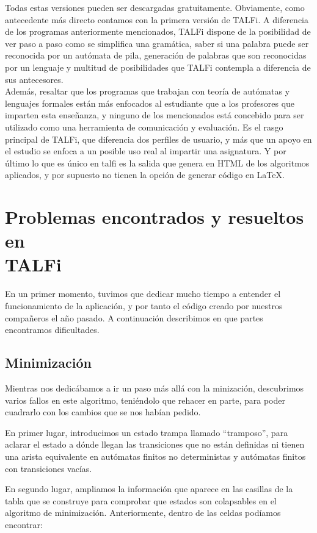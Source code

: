 \documentclass[12pt,a4paper,spanish]{book}
\begin{document}
Todas estas versiones pueden ser descargadas gratuitamente.
Obviamente, como antecedente m\'as directo contamos con la primera versi\'on de TALFi.
A diferencia de los programas anteriormente mencionados, TALFi dispone de la posibilidad de ver paso a paso como se simplifica una gram\'atica, saber si una palabra puede ser reconocida por un aut\'omata de pila, generaci\'on de palabras que son reconocidas por un lenguaje y multitud de posibilidades que TALFi contempla a diferencia de sus antecesores.\\
Adem\'as, resaltar que los programas que trabajan con teor\'ia de aut\'omatas y lenguajes formales est\'an m\'as enfocados al estudiante que a los profesores que imparten esta ense\~{n}anza, y ninguno de los mencionados est\'a concebido para ser utilizado como una herramienta de comunicaci\'on y evaluaci\'on. Es el rasgo principal de TALFi, que diferencia dos perfiles de usuario, y m\'as que un apoyo en el estudio se enfoca a un posible uso real al impartir una asignatura. Y por \'ultimo lo que es \'unico en talfi es la salida que genera en HTML de los algoritmos aplicados, y por supuesto no tienen la opci\'on de generar c\'odigo en \LaTeX{}.

\section{Problemas encontrados y resueltos en\\
TALFi}
En un primer momento, tuvimos que dedicar mucho tiempo a entender el funcionamiento de la aplicaci\'on, y por tanto el c\'odigo creado por nuestros compa\~neros el a\~no pasado. A continuaci\'on describimos en que partes encontramos dificultades.

\subsection{Minimizaci\'on}
\label{sec:min}
Mientras nos dedic\'abamos a ir un paso m\'as all\'a con la minizaci\'on, descubrimos varios fallos en este algoritmo, teni\'endolo que rehacer en parte, para poder cuadrarlo con los cambios que se nos hab\'ian pedido.

En primer lugar, introducimos un estado trampa llamado ``tramposo'', para aclarar el estado a d\'onde llegan las transiciones que no est\'an definidas ni tienen una arista equivalente en aut\'omatas finitos no deterministas y aut\'omatas finitos con transiciones vac\'ias.

En segundo lugar, ampliamos la informaci\'on que aparece en las casillas de la tabla que se construye para comprobar que estados son colapsables en el algoritmo de minimizaci\'on. Anteriormente, dentro de las celdas pod\'iamos encontrar:
\end{document}
